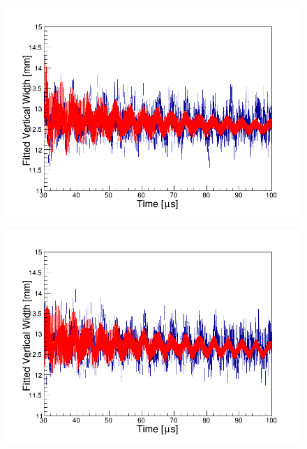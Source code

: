 \begin{figure}
\centering
\begin{minipage}{.5\textwidth}
  \centering
  \includegraphics[width=\linewidth]{Figures/VertWidthTest_iterExp_station12.png}
  \label{fig:VertWidthTest_iterExp_station12.png}
\end{minipage}%
\begin{minipage}{.5\textwidth}
  \centering
  \includegraphics[width=\linewidth]{Figures/VertWidthTest_iterExp_station18.png}
  \label{fig:VertWidthTest_iterExp_station18.png}
\end{minipage}
\end{figure}

